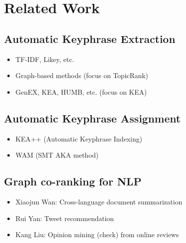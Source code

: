 \section{Related Work}
\label{sec:related_work}

  \subsection{Automatic Keyphrase Extraction}
  \label{subsec:ake}
    \begin{itemize}
      \item{TF-IDF, Likey, etc.}
      \item{Graph-based methods (focus on TopicRank)}
      \item{GenEX, KEA, HUMB, etc. (focus on KEA)}
    \end{itemize}

  \subsection{Automatic Keyphrase Assignment}
  \label{subsec:aka}
    \begin{itemize}
      \item{KEA++ (Automatic Keyphrase Indexing)}
      \item{WAM (SMT AKA method)}
    \end{itemize}

  \subsection{Graph co-ranking for NLP}
  \label{subsec:graph_co_ranking_for_nlp}
    \begin{itemize}
      \item{Xiaojun Wan: Cross-language document summarization}
      \item{Rui Yan: Tweet recommendation}
      \item{Kang Liu: Opinion mining (check) from online reviews}
    \end{itemize}

